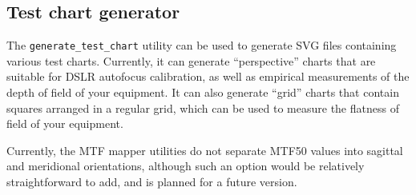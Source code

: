 \documentclass[a4paper]{article}
\begin{document}
\subsection{Test chart generator}
The \texttt{generate\_test\_chart} utility can be used to generate SVG files
containing various test charts. Currently, it can generate ``perspective''
charts that are suitable for DSLR autofocus calibration, as well as
empirical measurements of the depth of field of your equipment. It can also
generate ``grid'' charts that contain squares arranged in a regular grid,
which can be used to measure the flatness of field of your
equipment.

Currently, the MTF mapper utilities do not separate MTF50 values into
sagittal and meridional orientations, although such an option would be
relatively straightforward to add, and is planned for a future version.
\end{document}
